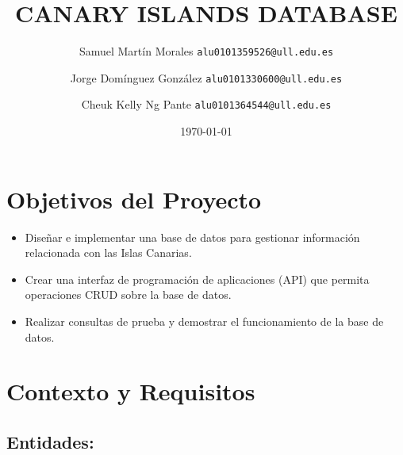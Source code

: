 \documentclass[11pt]{report}
\begin{document}
\title{CANARY ISLANDS DATABASE}
\author{Samuel Martín Morales  \texttt{alu0101359526@ull.edu.es} \and Jorge Domínguez González  \texttt{alu0101330600@ull.edu.es} \and Cheuk Kelly Ng Pante \texttt{alu0101364544@ull.edu.es} }
\date{\today}

\maketitle

\section{Objetivos del Proyecto}
\begin{itemize}
    \item Diseñar e implementar una base de datos para gestionar información relacionada con las Islas Canarias.
    \item Crear una interfaz de programación de aplicaciones (API) que permita operaciones CRUD sobre la base de datos.
    \item Realizar consultas de prueba y demostrar el funcionamiento de la base de datos.
\end{itemize}

\section{Contexto y Requisitos}
\subsection{Entidades:}
\end{document}
